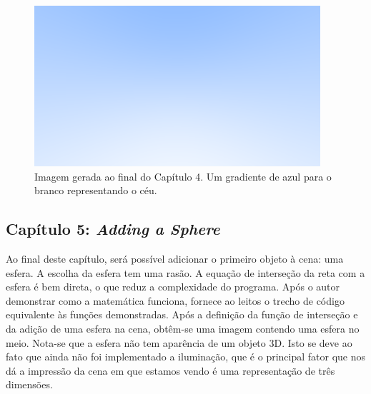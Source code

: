 \documentclass[journal]{IEEEtran}
\begin{document}
\begin{figure}[ht]
  \centering
  \includegraphics[width=\linewidth]{media/img-1.02-blue-to-white.png}
  \caption{Imagem gerada ao final do Capítulo 4. Um gradiente de azul para o branco representando o céu.}
  \label{img_blue_grad}
\end{figure}

\subsection*{Capítulo 5: \emph{Adding a Sphere}}
Ao final deste capítulo, será possível adicionar o primeiro objeto à cena: uma esfera. A escolha da esfera
tem uma rasão. A equação de interseção da reta com a esfera é bem direta, o que reduz a complexidade do
programa. Após o autor demonstrar como a matemática funciona, fornece ao leitos o trecho de código equivalente
às funções demonstradas. Após a definição da função de interseção e da adição de uma esfera na cena, obtêm-se
uma imagem contendo uma esfera no meio. Nota-se que a esfera não tem aparência de um objeto 3D. Isto se deve
ao fato que ainda não foi implementado a iluminação, que é o principal fator que nos dá a impressão da cena 
em que estamos vendo é uma representação de três dimensões.
\end{document}
